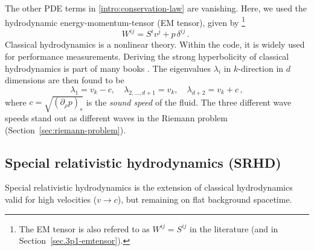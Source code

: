 %
The other PDE terms in \eqref{intro:conservation-law} are vanishing.
%
Here, we used the hydrodynamic energy-momentum-tensor (EM tensor), given by
\footnote{
	The EM tensor is also refered to as $W^{ij}=S^{ij}$ in the literature
	(and in Section~\ref{sec.3p1-emtensor}).}%
\begin{equation}\label{eq.hd.emtensor}
W^{ij} = S^i v^j + p \, \delta^{ij}  \, . \,\,
\end{equation}%
%
Classical hydrodynamics is a nonlinear theory. Within the  code,
it is widely used for performance measurements. Deriving the strong 
hyperbolicity of classical hydrodynamics is part of many books
\cite{Toro09,Rezzolla_book:2013}. The eigenvalues $\lambda_i$ in $k$-direction
in $d$ dimensions are then found to be
\begin{equation}\label{eq.hd.evs}
\lambda_1 = v_k - c,
\quad \lambda_{2,\dots,d+1} = v_k,
\quad \lambda_{d+2} = v_k + c \,,
\end{equation}
where $c=\sqrt{\left(\partial_\rho p\right)_s}$ is the \emph{sound speed} of 
the fluid. The three different wave speeds stand out as different waves in the
Riemann problem (Section~\ref{sec:riemann-problem}).

\subsection{Special relativistic hydrodynamics (SRHD)}
Special relativistic hydrodynamics is the extension of classical
hydrodynamics valid for high velocities ($v\to c$), but remaining on flat
background spacetime.

